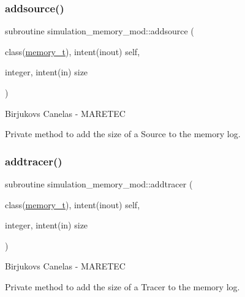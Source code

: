 \subsubsection{\texorpdfstring{addsource()}{addsource()}}
{\footnotesize\ttfamily subroutine simulation\+\_\+memory\+\_\+mod\+::addsource (\begin{DoxyParamCaption}\item[{class(\hyperlink{structsimulation__memory__mod_1_1memory__t}{memory\+\_\+t}), intent(inout)}]{self,  }\item[{integer, intent(in)}]{size }\end{DoxyParamCaption})\hspace{0.3cm}{\ttfamily [private]}}



Birjukovs Canelas -\/ M\+A\+R\+E\+T\+EC 

Private method to add the size of a Source to the memory log. \mbox{\label{namespacesimulation__memory__mod_a5770021491589bbd61ea112d113a9c9d}} 
\subsubsection{\texorpdfstring{addtracer()}{addtracer()}}
{\footnotesize\ttfamily subroutine simulation\+\_\+memory\+\_\+mod\+::addtracer (\begin{DoxyParamCaption}\item[{class(\hyperlink{structsimulation__memory__mod_1_1memory__t}{memory\+\_\+t}), intent(inout)}]{self,  }\item[{integer, intent(in)}]{size }\end{DoxyParamCaption})\hspace{0.3cm}{\ttfamily [private]}}



Birjukovs Canelas -\/ M\+A\+R\+E\+T\+EC 

Private method to add the size of a Tracer to the memory log. \mbox{\label{namespacesimulation__memory__mod_acf04d6b930ed3ffbc0950afd86033c51}} 
